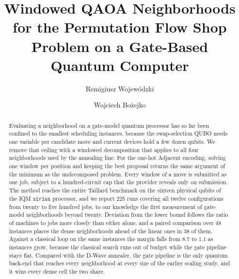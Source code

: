\documentclass[runningheads]{llncs}
\begin{document}
\title{Windowed QAOA Neighborhoods for the Permutation Flow Shop Problem
       on a Gate-Based Quantum Computer}
\author{Remigiusz Wojew\'{o}dzki \and Wojciech Bo\.{z}ejko}
\maketitle

\begin{abstract}
Evaluating a neighborhood on a gate-model quantum processor has so far been
confined to the smallest scheduling instances, because the swap-selection QUBO
needs one variable per candidate move and current devices hold a few dozen
qubits. We remove that ceiling with a windowed decomposition that applies to
all four neighborhoods used by the annealing line. For the one-hot Adjacent
encoding, solving one window per position and keeping the best proposal
returns the same argument of the minimum as the undecomposed problem. Every window of a move is submitted as one job, subject to a hundred-circuit cap that the provider reveals only on submission.
The method reaches the entire Taillard benchmark on the sixteen physical qubits
of the IQM \texttt{sirius} processor, and we
report 225 runs covering all twelve configurations from twenty to five hundred jobs, to our knowledge the first measurement of gate-model neighborhoods
beyond twenty. Deviation
from the lower bound follows the ratio of machines to jobs more closely than
either alone, and a paired comparison over 48 instances places the dense
neighborhoods ahead of the linear ones in 38 of them. Against a classical loop
on the same instances the margin falls from 8.7 to 1.1 as instances grow,
because the classical search runs out of budget while the gate pipeline stays
flat. Compared with the D-Wave annealer, the gate pipeline is the only quantum
back-end that reaches every neighborhood at every
size of the earlier scaling study, and it wins every dense cell the two share.
\end{abstract}
\end{document}
